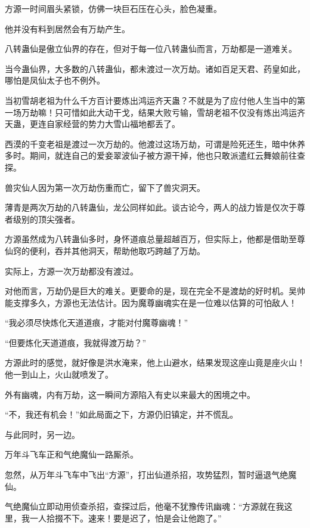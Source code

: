 
\begin{this_body}

方源一时间眉头紧锁，仿佛一块巨石压在心头，脸色凝重。

他并没有料到居然会有万劫产生。

八转蛊仙是傲立仙界的存在，但对于每一位八转蛊仙而言，万劫都是一道难关。

当今蛊仙界，大多数的八转蛊仙，都未渡过一次万劫。诸如百足天君、药皇如此，哪怕是凤仙太子也不例外。

当初雪胡老祖为什么千方百计要炼出鸿运齐天蛊？不就是为了应付他人生当中的第一场万劫嘛！只可惜如此大动干戈，结果大败亏输，雪胡老祖不仅没有炼出鸿运齐天蛊，更连自家经营的势力大雪山福地都丢了。

西漠的千变老祖是渡过一次万劫的。他渡过这场万劫，可谓是险死还生，暗中休养多时。期间，就连自己的爱妾翠波仙子被方源干掉，他也只敢派遣红云舞娘前往查探。

兽灾仙人因为第一次万劫伤重而亡，留下了兽灾洞天。

薄青是两次万劫的八转蛊仙，龙公同样如此。谈古论今，两人的战力皆是仅次于尊者级别的顶尖强者。

方源虽然成为八转蛊仙多时，身怀道痕总量超越百万，但实际上，他都是借助至尊仙窍的便利，吞并其他洞天，帮助他取巧跨越了万劫。

实际上，方源一次万劫都没有渡过。

对他而言，万劫仍是巨大的难关。更要命的是，现在完全不是渡劫的好时机。吴帅能支撑多久，方源也无法估计。因为魔尊幽魂实在是一位难以估算的可怕敌人！

“我必须尽快炼化天道道痕，才能对付魔尊幽魂！”

“但要炼化天道道痕，我就得渡万劫？”

方源此时的感觉，就好像是洪水淹来，他上山避水，结果发现这座山竟是座火山！他一到山上，火山就喷发了。

外有幽魂，内有万劫，这一瞬间方源陷入有史以来最大的困境之中。

“不，我还有机会！”如此局面之下，方源仍旧镇定，并不慌乱。

与此同时，另一边。

万年斗飞车正和气绝魔仙一路厮杀。

忽然，从万年斗飞车中飞出“方源”，打出仙道杀招，攻势猛烈，暂时逼退气绝魔仙。

气绝魔仙立即动用侦查杀招，查探过后，他毫不犹豫传讯幽魂：“方源就在我这里，我一人拾掇不下。速来！要是迟了，怕是会让他跑了。”


\end{this_body}
